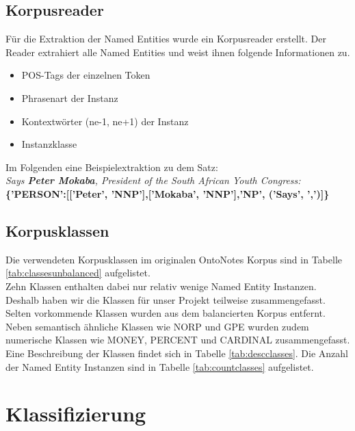 \documentclass[bibliography=totoc]{scrartcl}
\begin{document}
	\subsection{Korpusreader}
	Für die Extraktion der Named Entities wurde ein Korpusreader erstellt. Der Reader extrahiert alle Named Entities und weist ihnen folgende Informationen zu.
	
	\begin{itemize}
		\item POS-Tags der einzelnen Token
		\item Phrasenart der Instanz
		\item Kontextwörter (ne-1, ne+1) der Instanz
		\item Instanzklasse
	\end{itemize}
	Im Folgenden eine Beispielextraktion zu dem Satz:\\
	\textit{Says \textbf{Peter Mokaba}, President of the South African Youth Congress:}\\
	
	\textbf{\{'PERSON':[['Peter', 'NNP'],['Mokaba', 'NNP'],'NP', ('Says', ',')]\}}
	\subsection{Korpusklassen}
	Die verwendeten Korpusklassen im originalen OntoNotes Korpus sind in Tabelle \ref{tab:classesunbalanced} aufgelistet.\\
	Zehn Klassen enthalten dabei nur relativ wenige Named Entity Instanzen. Deshalb haben wir die Klassen für unser Projekt teilweise zusammengefasst. Selten vorkommende Klassen wurden aus dem balancierten Korpus entfernt. Neben semantisch ähnliche Klassen wie NORP und GPE wurden zudem numerische Klassen wie MONEY, PERCENT und CARDINAL zusammengefasst. Eine Beschreibung der Klassen findet sich in Tabelle \ref{tab:descclasses}. Die Anzahl der Named Entity Instanzen sind in Tabelle \ref{tab:countclasses} aufgelistet.
\section{Klassifizierung}
	
\end{document}
